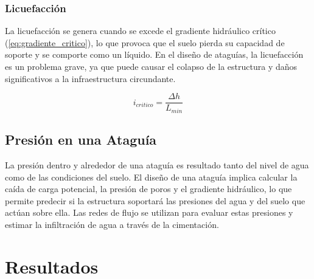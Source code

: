 \subsubsection{Licuefacción}
La licuefacción se genera cuando se excede el gradiente hidráulico crítico (\ref{eq:gradiente_critico}), lo que provoca que el suelo pierda su capacidad de soporte y se comporte como un líquido. En el diseño de ataguías, la licuefacción es un problema grave, ya que puede causar el colapso de la estructura y daños significativos a la infraestructura circundante. \cite{budhu_soil_2010}

\begin{equation}
    i_{critico} = \frac{\Delta h}{L_{min}}
    \label{eq:gradiente_critico}
\end{equation}

\subsection{Presión en una Ataguía}
La presión dentro y alrededor de una ataguía es resultado tanto del nivel de agua como de las condiciones del suelo. El diseño de una ataguía implica calcular la caída de carga potencial, la presión de poros y el gradiente hidráulico, lo que permite predecir si la estructura soportará las presiones del agua y del suelo que actúan sobre ella. Las redes de flujo se utilizan para evaluar estas presiones y estimar la infiltración de agua a través de la cimentación. \cite{sivakugan2005}
\newpage
\section{Resultados}

